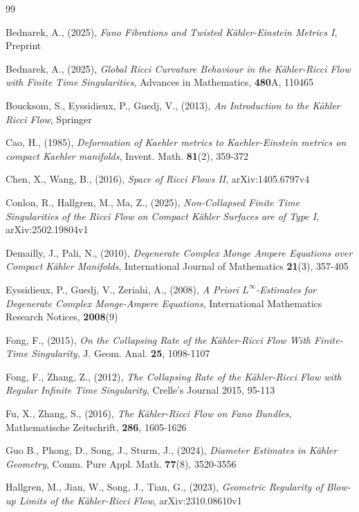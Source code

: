 \documentclass[12pt]{article}
\numberwithin{equation}{section}
\begin{document}
\begin{thebibliography}{99}

 Bednarek, A., (2025),
\textit{Fano Fibrations and Twisted K\"ahler-Einstein Metrics I},
Preprint

 Bednarek, A., (2025), 
\textit{Global Ricci Curvature Behaviour in the K\"ahler-Ricci Flow with Finite Time Singularities}, 
Advances in Mathematics, \textbf{480}A, 110465

 Boucksom, S., Eyssidieux, P., Guedj, V., (2013), 
\textit{An Introduction to the K\"ahler Ricci Flow}, 
Springer

 Cao, H., (1985), 
\textit{Deformation of Kaehler metrics to Kaehler-Einstein metrics on compact Kaehler manifolds}, 
Invent. Math. \textbf{81}(2), 359-372

 Chen, X., Wang, B., (2016), 
\textit{Space of Ricci Flows II}, 
arXiv:1405.6797v4

 Conlon, R., Hallgren, M., Ma, Z., (2025), 
\textit{Non-Collapsed Finite Time Singularities of the Ricci Flow on Compact K\"ahler Surfaces are of Type I}, 
arXiv:2502.19804v1

 Demailly, J., Pali, N., (2010), 
\textit{Degenerate Complex Monge Ampere Equations over Compact K\"ahler Manifolds}, 
International Journal of Mathematics \textbf{21}(3), 357-405

 Eyssidieux, P., Guedj, V., Zeriahi, A., (2008), 
\textit{A Priori $L^{\infty}$-Estimates for Degenerate Complex Monge-Ampere Equations}, International Mathematics Research Notices, \textbf{2008}(9)

 Fong, F., (2015), 
\textit{On the Collapsing Rate of the K\"ahler-Ricci Flow With Finite-Time Singularity}, 
J. Geom. Anal. \textbf{25}, 1098-1107

 Fong, F., Zhang, Z., (2012), 
\textit{The Collapsing Rate of the K\"ahler-Ricci Flow with Regular Infinite Time Singularity}, 
Crelle's Journal 2015, 95-113

 Fu, X., Zhang, S., (2016), 
\textit{The K\"ahler-Ricci Flow on Fano Bundles},
Mathematische Zeitschrift, \textbf{286}, 1605-1626

 Guo B., Phong, D., Song, J., Sturm, J., (2024), \textit{Diameter Estimates in K\"ahler Geometry}, 
Comm. Pure Appl. Math. \textbf{77}(8), 3520-3556

 Hallgren, M., Jian, W., Song, J., Tian, G., (2023), \textit{Geometric Regularity of Blow-up Limits of the K\"ahler-Ricci Flow}, 
arXiv:2310.08610v1


\end{thebibliography}
\end{document}
